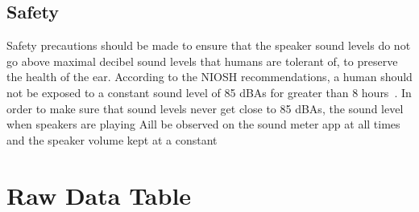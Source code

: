\documentclass[index]{subfiles}
\begin{document}
\subsection{Safety}

Safety precautions should be made to ensure that the speaker sound levels do not go above maximal decibel sound levels that humans are tolerant of, to preserve the health of the ear. According to the NIOSH recommendations, a human should not be exposed to a constant sound level of 85 dBAs for greater than 8 hours~\cite{cdc}. In order to make sure that sound levels never get close to 85 dBAs, the sound level when speakers are playing Aill be observed on the sound meter app at all times and the speaker volume kept at a constant

\section{Raw Data Table}

\end{document}
